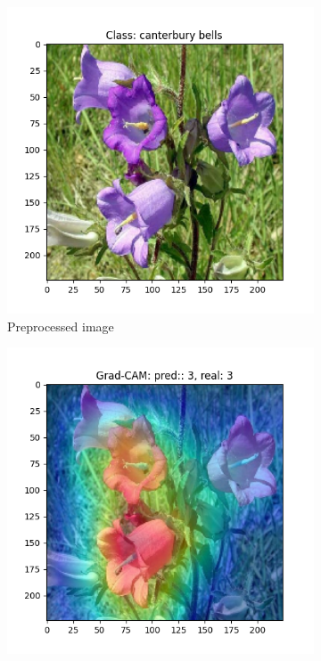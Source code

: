 \begin{figure}[h!]
    \centering
    \begin{subfigure}[b]{0.32\textwidth}
        \centering
        \includegraphics[width=\textwidth]{Images/saliency-flowers/510/image_510.png}
        \caption{Preprocessed image}
    \end{subfigure}
    \hfill
    \begin{subfigure}[b]{0.32\textwidth}
        \centering
        \includegraphics[width=\textwidth]{Images/saliency-flowers/510/GradCAM_510_no_aug.png}

\end{subfigure}
\end{figure}
